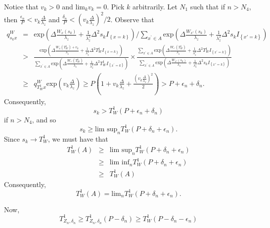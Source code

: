 \documentclass[11pt,english]{article}
\begin{document}
Notice that $v_{k}>0$ and $\mbox{lim}_{k}v_{k}=0$. Pick $k$ arbitrarily.
Let $N_{1}$ such that if $n>N_{4}$, then $\frac{\epsilon_{n}}{P}<v_{k}\frac{\Delta}{\lambda_{z}}$
and $\frac{\delta_{n}}{P}<\left(v_{k}\frac{\Delta}{\lambda_{z}}\right)^{2}/2$.
$ $Observe that
\begin{eqnarray*}
q_{s_{k}x}^{W} & = & \mbox{exp}\left(\Delta\frac{W_{x}\left(s_{k}\right)}{\lambda_{z}}+\frac{1}{\lambda_{z}^{2}}\Delta^{2}s_{k}I_{\left\{ x=k\right\} }\right)/\sum_{x^{'}\in A}\mbox{exp}\left(\Delta\frac{W_{x'}\left(s_{k}\right)}{\lambda_{z}}+\frac{1}{\lambda_{z}^{2}}\Delta^{2}s_{k}I_{\left\{ x'=k\right\} }\right)\\
 & > & \frac{\mbox{exp}\left(\Delta\frac{W_{x}\left(T_{W}^{1}\right)+v_{k}}{\lambda_{z}}+\frac{1}{\lambda_{z}^{2}}\Delta^{2}T_{W}^{1}I_{\left\{ x=k\right\} }\right)}{\sum_{x^{'}\in A}\mbox{exp}\left(\Delta\frac{W_{^{x'}}\left(T_{W}^{1}\right)}{\lambda_{z}}+\frac{1}{\lambda_{z}^{2}}\Delta^{2}T_{W}^{1}I_{\left\{ x^{'}=k\right\} }\right)}\times\frac{\sum_{x^{'}\in A}\mbox{exp}\left(\Delta\frac{W_{^{x'}}\left(T_{W}^{1}\right)}{\lambda_{z}}+\frac{1}{\lambda_{z}^{2}}\Delta^{2}T_{W}^{1}I_{\left\{ x^{'}=k\right\} }\right)}{\sum_{x^{'}\in A}\mbox{exp}\left(\Delta\frac{W_{x'}\left(s_{k}\right)}{\lambda_{z}}+\frac{1}{\lambda_{z}^{2}}\Delta^{2}s_{k}I_{\left\{ x'=k\right\} }\right)}\\
 & \geq & q_{T_{W}^{1}x}^{W}\mbox{exp}\left(v_{k}\frac{\Delta}{\lambda_{z}}\right)\geq P\left(1+v_{k}\frac{\Delta}{\lambda_{z}}+\frac{\left(v_{k}\frac{\Delta}{\lambda_{z}}\right)^{2}}{2}\right)>P+\epsilon_{n}+\delta_{n}.
\end{eqnarray*}
Consequently, 
\[
s_{k}>T_{W}^{1}\left(P+\epsilon_{n}+\delta_{n}\right)
\]
if $n>N_{4}$, and so 
\[
s_{k}\geq\mbox{lim sup}_{n}T_{W}^{1}\left(P+\delta_{n}+\epsilon_{n}\right).
\]
Since $s_{k}\rightarrow T_{W}^{1}$, we must have that
\begin{eqnarray*}
T_{W}^{1}\left(A\right) & \geq & \mbox{lim sup}_{n}T_{W}^{1}\left(P+\delta_{n}+\epsilon_{n}\right)\\
 & \geq & \mbox{lim inf}_{n}T_{W}^{1}\left(P+\delta_{n}+\epsilon_{n}\right)\\
 & \geq & T_{W}^{1}\left(A\right)
\end{eqnarray*}
Consequently, 
\[
T_{W}^{1}\left(A\right)=\mbox{lim}_{n}T_{W}^{1}\left(P+\delta_{n}+\epsilon_{n}\right).
\]


Now,
\[
T_{Z_{n},\delta_{n}}^{1}\geq T_{Z_{n},\delta_{n}}^{1}\left(P-\delta_{n}\right)\geq T_{W}^{1}\left(P-\delta_{n}-\epsilon_{n}\right)
\]
\end{document}
